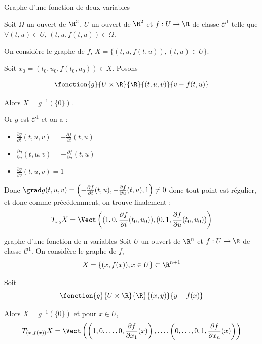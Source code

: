 \begin{exemple}
    Graphe d'une fonction de deux variables 

    Soit $\Omega$ un ouvert de $\R^3$, $U$ un ouvert de $\R^2$ et 
    $f : U \to \R$ de classe $\mathscr C^1$ telle que $\forall (t, u) \in U$, $(t, u, f(t, u)) \in \Omega$.

    On considère le graphe de $f$, $X = \{(t, u, f(t, u)), (t, u) \in U\}$. 

    Soit $x_0 = (t_0, u_0, f(t_0, u_0)) \in X$.
    Posons 
    
    $$\fonction{g}{U \times \R}{\R}{(t, u, v)}{v - f(t, u)}$$

    Alors $X = g^{-1}(\{0\})$.

    Or $g$ est $\mathscr C^1$ et on a : 
    \begin{itemize}
        \item $\displaystyle \frac{\partial g}{\partial t}(t, u, v) = - \frac{\partial f}{\partial t}(t, u)$
        \item $\displaystyle \frac{\partial g}{\partial u}(t, u, v) = - \frac{\partial f}{\partial u}(t, u)$
        \item $\displaystyle \frac{\partial g}{\partial v}(t, u, v) = 1$
    \end{itemize}

    Donc $\grad g(t, u, v) = \left(- \frac{\partial f}{\partial t}(t, u), - \frac{\partial f}{\partial u}(t, u), 1 \right) \neq 0$
    donc tout point est régulier, et donc comme précédemment, on trouve finalement : 
    $$T_{x_0}X = \Vect\left( (1, 0, \frac{\partial f}{\partial t}(t_0, u_0)), (0, 1, \frac{\partial f}{\partial u}(t_0, u_0)) \right)$$
\end{exemple}

\begin{propositionnt}{graphe d'une fonction de n variables}{}
    Soit $U$ un ouvert de $\R^n$ et $f : U \to \R$ de classe $\mathscr C^1$.
    On considère le graphe de $f$, 
    $$X = \{(x, f(x)), x \in U\} \subset \R^{n+1}$$

    Soit 
    $$\fonction{g}{U \times \R}{\R}{(x, y)}{y - f(x)}$$

    Alors $X = g^{-1}(\{0\})$ et pour $x \in U$,
    $$T_{(x, f(x))}X =  \Vect \left( \left(1, 0, \ldots, 0, \frac{\partial f}{\partial x_1}(x) \right), \ldots, \left(0, \ldots, 0, 1, \frac{\partial f}{\partial x_n}(x) \right) \right)$$
\end{propositionnt}


